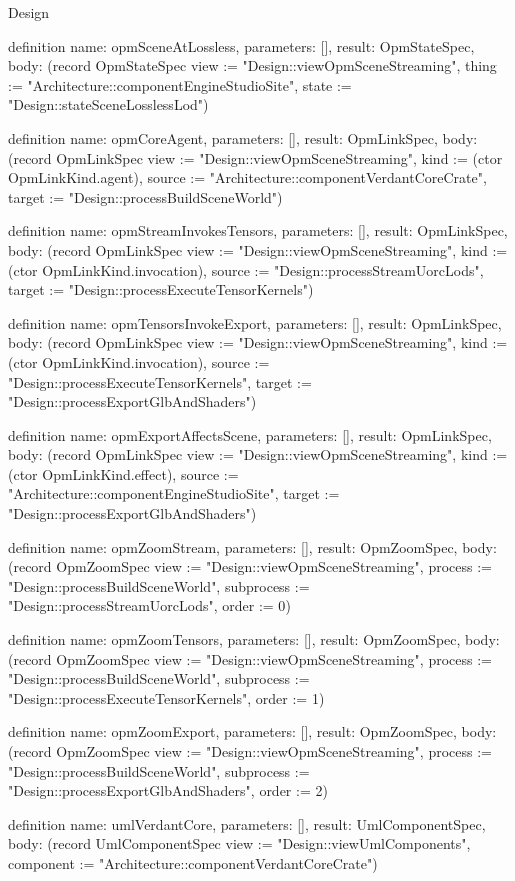 \begin{lexlean}{Design}
\begin{semanticmodule}
definition{
  name: opmSceneAtLossless,
  parameters: [],
  result: OpmStateSpec,
  body: (record OpmStateSpec {view := "Design::viewOpmSceneStreaming", thing := "Architecture::componentEngineStudioSite", state := "Design::stateSceneLosslessLod"})
}

definition{
  name: opmCoreAgent,
  parameters: [],
  result: OpmLinkSpec,
  body: (record OpmLinkSpec {view := "Design::viewOpmSceneStreaming", kind := (ctor OpmLinkKind.agent), source := "Architecture::componentVerdantCoreCrate", target := "Design::processBuildSceneWorld"})
}

definition{
  name: opmStreamInvokesTensors,
  parameters: [],
  result: OpmLinkSpec,
  body: (record OpmLinkSpec {view := "Design::viewOpmSceneStreaming", kind := (ctor OpmLinkKind.invocation), source := "Design::processStreamUorcLods", target := "Design::processExecuteTensorKernels"})
}

definition{
  name: opmTensorsInvokeExport,
  parameters: [],
  result: OpmLinkSpec,
  body: (record OpmLinkSpec {view := "Design::viewOpmSceneStreaming", kind := (ctor OpmLinkKind.invocation), source := "Design::processExecuteTensorKernels", target := "Design::processExportGlbAndShaders"})
}

definition{
  name: opmExportAffectsScene,
  parameters: [],
  result: OpmLinkSpec,
  body: (record OpmLinkSpec {view := "Design::viewOpmSceneStreaming", kind := (ctor OpmLinkKind.effect), source := "Architecture::componentEngineStudioSite", target := "Design::processExportGlbAndShaders"})
}

definition{
  name: opmZoomStream,
  parameters: [],
  result: OpmZoomSpec,
  body: (record OpmZoomSpec {view := "Design::viewOpmSceneStreaming", process := "Design::processBuildSceneWorld", subprocess := "Design::processStreamUorcLods", order := 0})
}

definition{
  name: opmZoomTensors,
  parameters: [],
  result: OpmZoomSpec,
  body: (record OpmZoomSpec {view := "Design::viewOpmSceneStreaming", process := "Design::processBuildSceneWorld", subprocess := "Design::processExecuteTensorKernels", order := 1})
}

definition{
  name: opmZoomExport,
  parameters: [],
  result: OpmZoomSpec,
  body: (record OpmZoomSpec {view := "Design::viewOpmSceneStreaming", process := "Design::processBuildSceneWorld", subprocess := "Design::processExportGlbAndShaders", order := 2})
}

definition{
  name: umlVerdantCore,
  parameters: [],
  result: UmlComponentSpec,
  body: (record UmlComponentSpec {view := "Design::viewUmlComponents", component := "Architecture::componentVerdantCoreCrate"})
}


\end{semanticmodule}
\end{lexlean}
